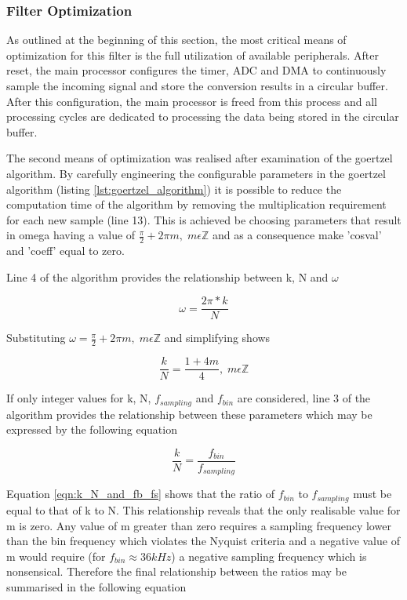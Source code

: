 \subsubsection{Filter Optimization}
\label{sec:filter_optimization_design}
As outlined at the beginning of this section, the most critical means of optimization for this filter is the full utilization of available peripherals. After reset, the main processor configures the timer, ADC and DMA to continuously sample the incoming signal and store the conversion results in a circular buffer. After this configuration, the main processor is freed from this process and all processing cycles are dedicated to processing the data being stored in the circular buffer.

The second means of optimization was realised after examination of the goertzel algorithm. By carefully engineering the configurable parameters in the goertzel algorithm (listing \ref{lst:goertzel_algorithm}) it is possible to reduce the computation time of the algorithm by removing the multiplication requirement for each new sample (line 13). This is achieved be choosing parameters that result in omega having a value of \(\frac{\pi}{2} + 2\pi m,\; m\epsilon \mathbb{Z}\) and as a consequence make 'cosval' and 'coeff' equal to zero.

Line 4 of the algorithm provides the relationship between k, N and $\omega$

\begin{equation}
	\omega = \frac{2\pi * k}{N}
\end{equation}

Substituting \(\omega = \frac{\pi}{2} + 2\pi m,\; m\epsilon \mathbb{Z}\) and simplifying shows

\begin{equation}
\label{eqn:k_N_constraint}
	\frac{k}{N} = \frac{1+4m}{4},\; m\epsilon \mathbb{Z}
\end{equation}

If only integer values for k, N, $f_{sampling}$ and $f_{bin}$ are considered, line 3 of the algorithm provides the relationship between these parameters which may be expressed by the following equation

\begin{equation}
\label{eqn:k_N_and_fb_fs}
	\frac{k}{N} = \frac{f_{bin}}{f_{sampling}}
\end{equation}


Equation \ref{eqn:k_N_and_fb_fs} shows that the ratio of $f_{bin}$ to $f_{sampling}$ must be equal to that of k to N. This relationship reveals that the only realisable value for m is zero. Any value of m greater than zero requires a sampling frequency lower than the bin frequency which violates the Nyquist criteria and a negative value of m would require (for $f_{bin} \approx 36kHz$) a negative sampling frequency which is nonsensical. Therefore the final relationship between the ratios may be summarised in the following equation

